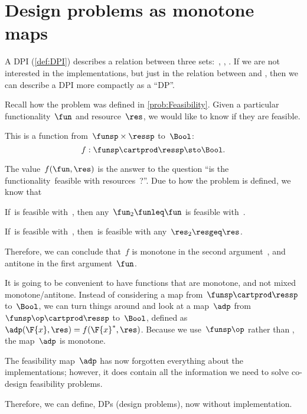 

\section{Design problems as monotone maps}
\label{sec:dpdefinition}



A DPI (\cref{def:DPI}) describes a relation between three sets:~\funsp, \ressp, \impsp.
If we are not interested in the implementations, but just in the relation between \funsp and \ressp, then we can describe a DPI more compactly as a ``DP''\@.

Recall how the problem \Feasibility was defined in \cref{prob:Feasibility}.
Given a particular functionality~$\fun$ and resource~$\res$, we would like to know if they are feasible.

This is a function from~$\funsp \times \ressp$ to~$\Bool$:
\begin{equation}
    f: \funsp \cartprod \ressp \sto \Bool.
\end{equation}

The value~$f(\fun, \res)$ is the answer to the question ``is the functionality~\fun feasible with resources~\res?''. Due to how the problem is defined, we know that%
\begin{compactenum}
    \item If~\fun is feasible with~\res, then any~$\fun_2 \funleq \fun$ is feasible with~\res.
    \item If~\fun is feasible with~\res, then~\fun is feasible with any~$\res_2 \resgeq \res$.
\end{compactenum}
Therefore, we can conclude that~$f$ is monotone in the second argument~\res, and antitone in the first argument~$\fun$.

It is going to be convenient to have functions that are monotone, and not mixed
monotone/antitone.
Instead of considering a map from~$\funsp \cartprod \ressp$ to~$\Bool$, we can turn things around and look at a map~$\adp$ from~$\funsp\op \cartprod \ressp$ to~$\Bool$, defined as~$\adp(\F{x},\res) = f(\F{x}^*,\res)$.
Because we use~$\funsp\op$ rather than \funsp, the map~$\adp$ is monotone.

The feasibility map~$\adp$ has now forgotten everything about the implementations; however, it does contain all the information we need to solve co-design feasibility problems.

Therefore, we can define, DPs (design problems), now without implementation.

